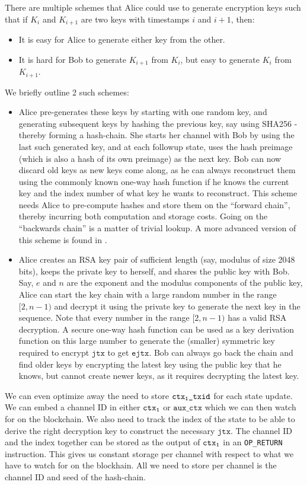 There are multiple schemes that Alice could use to generate encryption keys such that if $K_i$ and $K_{i+1}$ are two keys with timestamps $\mathit{i}$ and $i+1$, then:
\begin{itemize}
\item It is easy for Alice to generate either key from the other.
\item It is hard for Bob to generate $K_{i+1}$ from $K_i$, but easy to generate $K_i$ from $K_{i+1}$. 
\end{itemize}
We briefly outline 2 such schemes:
\begin{itemize}
    \item Alice pre-generates these keys by starting with one random key, and generating subsequent keys by hashing the previous key, say using SHA256 - thereby forming a hash-chain. She starts her channel with Bob by using the last such generated key, and at each followup state, uses the hash preimage (which is also a hash of its own preimage) as the next key. Bob can now discard old keys as new keys come along, as he can always reconstruct them using the commonly known one-way hash function if he knows the current key and the index number of what key he wants to reconstruct. This scheme needs Alice to pre-compute hashes and store them on the ``forward chain'', thereby incurring both computation and storage costs. Going on the ``backwards chain'' is a matter of trivial lookup. A more advanced version of this scheme is found in \cite{shachain}.
    \item Alice creates an RSA key pair of sufficient length (say, modulus of size 2048 bits), keeps the private key to herself, and shares the public key with Bob. Say, $\mathit{e}$ and $\mathit{n}$ are the exponent and the modulus components of the public key, Alice can start the key chain with a large random number in the range $\mathit{[2, n-1)}$ and decrypt it using the private key to generate the next key in the sequence. Note that every number in the range $\mathit{[2, n-1)}$ has a valid RSA decryption. A secure one-way hash function can be used as a key derivation function on this large number to generate the (smaller) symmetric key required to encrypt $\texttt{jtx}$ to get $\texttt{ejtx}$. Bob can always go back the chain and find older keys by encrypting the latest key using the public key that he knows, but cannot create newer keys, as it requires decrypting the latest key.
\end{itemize}

We can even optimize away the need to store $\texttt{ctx\textsubscript{1}\_txid}$ for each state update. We can embed a channel ID in either $\texttt{ctx\textsubscript{1}}$ or $\texttt{aux\_ctx}$ which we can then watch for on the blockchain. We also need to track the index of the state to be able to derive the right decryption key to construct the necessary $\texttt{jtx}$. The channel ID and the index together can be stored as the  output of $\texttt{ctx\textsubscript{1}}$ in an \texttt{OP\_RETURN} instruction. This gives us constant storage per channel with respect to what we have to watch for on the blockhain. All we need to store per channel is the channel ID and seed of the hash-chain. 

